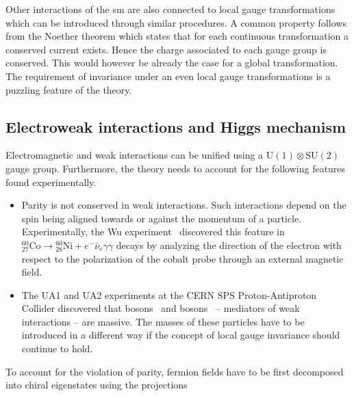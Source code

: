 Other interactions of the \gls{sm} are also connected to local gauge transformations which can be introduced through similar procedures. A common property follows from the Noether theorem which states that for each continuous transformation a conserved current exists. Hence the charge associated to each gauge group is conserved. This would however be already the case for a global transformation. The requirement of invariance under an even local gauge transformations is a puzzling feature of the theory. 

\subsection{Electroweak interactions and Higgs mechanism}
\label{sec:theory-ewk}

Electromagnetic and weak interactions can be unified using a $\mathrm{U(1)}\otimes \mathrm{SU(2)}$ gauge group. Furthermore, the theory needs to account for the following features found experimentally.

\begin{itemize}

\item Parity is not conserved in weak interactions. Such interactions depend on the spin being aligned towards or against the momentum of a particle. Experimentally, the Wu experiment~\cite{PhysRev.105.1413} discovered this feature in ${}_{27}^{60}\mathrm{Co}\to{}_{28}^{60}\mathrm{Ni}+e^{-}\bar{\nu}_{e}\gamma\gamma$ decays by analyzing the direction of the electron with respect to the polarization of the cobalt probe through an external magnetic field. 

\item The UA1 and UA2 experiments at the CERN SPS Proton-Antiproton Collider discovered that \wboson bosons~\cite{Arnison:1983rp,Banner:1983jy} and \zboson bosons~\cite{Arnison:1983mk,Bagnaia:1983zx} -- mediators of weak interactions -- are massive. The masses of these particles have to be introduced in a different way if the concept of local gauge invariance should continue to hold.

\end{itemize}

To account for the violation of parity, fermion fields have to be first decomposed into chiral eigenstates using the projections

